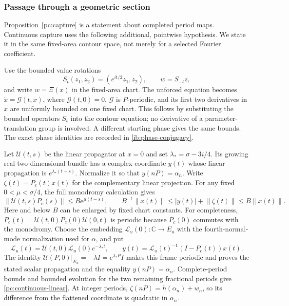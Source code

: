 \documentclass[11pt]{amsart}
\theoremstyle{remark}
\numberwithin{equation}{section}
\newcommand{\norm}[1]{\left\lVert#1\right\rVert}
\newcommand{\C}{\mathbb C}
\begin{document}
\subsubsection{Passage through a geometric section}
\label{pc:continuous-section}

Proposition~\ref{pc:capture} is a statement about completed period
maps. Continuous capture uses the following additional, pointwise
hypothesis. We state it in the same fixed-area contour space, not merely
for a selected Fourier coefficient.

Use the bounded value rotations
\[
 S_t(z_1,z_2)=(e^{it/2}z_1,z_2),\qquad w=S_{-t}z,
\]
and write $w=\Xi(x)$ in the fixed-area chart. The unforced equation
becomes $\dot x=\mathcal G(t,x)$, where $\mathcal G(t,0)=0$,
$\mathcal G$ is $P$-periodic, and its first two derivatives in $x$
are uniformly bounded on one fixed chart. This follows by substituting
the bounded operators $S_t$ into the contour equation; no derivative
of a parameter-translation group is involved. A different starting
phase gives the same bounds. The exact phase identities are recorded
in \eqref{ib:phase-conjugacy}.

Let $\mathcal U(t,s)$ be the linear propagator at $x=0$ and set
$\lambda_* =\sigma-3i/4$. Its growing real two-dimensional bundle has
a complex coordinate $y(t)$ whose linear propagation is
$e^{\lambda_*(t-s)}$. Normalize it so that $y(nP)=\alpha_n$.
Write $\zeta(t)=P_c(t)x(t)$ for the complementary linear projection.
For any fixed $0<\mu<\sigma/4$, the full monodromy calculation gives
\begin{equation}\label{pc:continuous-linear}
 \norm{\mathcal U(t,s)P_c(s)}\le B e^{\mu(t-s)},\qquad
 B^{-1}\norm{x(t)}\le |y(t)|+\norm{\zeta(t)}\le B\norm{x(t)}.
\end{equation}
Here and below $B$ can be enlarged by fixed chart constants.
For completeness, $P_c(t)=\mathcal U(t,0)P_c(0)\mathcal U(0,t)$ is
periodic because $P_c(0)$ commutes with the monodromy. Choose the
embedding $\mathcal L_u(0):\C\to E_u$ with the fourth-normal-mode
normalization used for $\alpha$, and put
\[
 \mathcal L_u(t)=\mathcal U(t,0)\mathcal L_u(0)e^{-\lambda_*t},
 \qquad y(t)=\mathcal L_u(t)^{-1}(I-P_c(t))x(t).
\]
The identity $\mathcal U(P,0)|_{E_u}=-\lambda I=e^{\lambda_*P}I$
makes this frame periodic and proves the stated scalar propagation
and the equality $y(nP)=\alpha_n$. Complete-period bounds and bounded
evolution for the two remaining fractional periods give
\eqref{pc:continuous-linear}. At integer periods,
$\zeta(nP)=h(\alpha_n)+w_n$, so its difference from the flattened coordinate
is quadratic in $\alpha_n$.
\end{document}
